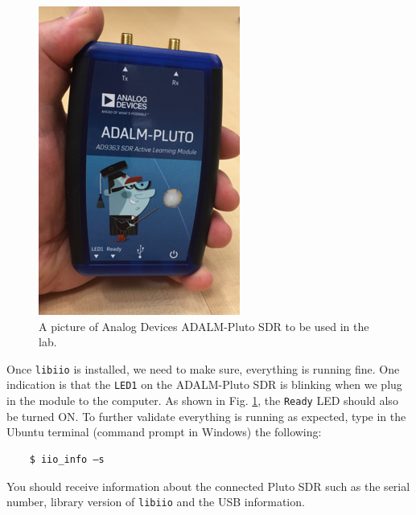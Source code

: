 \documentclass[11pt]{article}
\begin{document}
\begin{figure}
  \centering
  \includegraphics[width=.75\linewidth]{pluto_in_hand.png}
  \caption{A picture of Analog Devices ADALM-Pluto SDR to be used in the lab.}
  \label{fig:SDR_pluto}
  \end{figure}
 

Once \texttt{libiio} is installed, we need to make sure, everything is running fine. One indication is that the \texttt{LED1} on the ADALM-Pluto SDR is blinking when we plug in the module to the computer. As shown in Fig. \ref{fig:SDR_pluto}, the \texttt{Ready} LED should also be turned ON. To further validate everything is running as expected, type in the Ubuntu terminal (command prompt in Windows) the following:

\begin{mdframed}[backgroundcolor=gray!20]
  \tiny
  \begin{verbatim}
    $ iio_info –s
  \end{verbatim}
\end{mdframed}

You should receive information about the connected Pluto SDR such as the serial number, library version of \texttt{libiio} and the USB information. 
\end{document}
